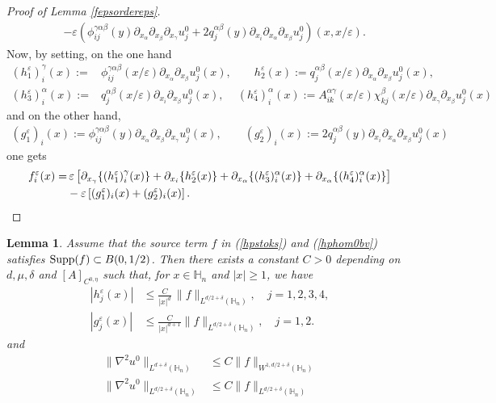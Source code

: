 \documentclass[11pt, reqno]{amsart}
\newtheorem{lemma}[theorem]{Lemma}
\theoremstyle{definition}
\theoremstyle{remark}
\numberwithin{equation}{section}
\DeclareMathOperator*{\Supp}{\textup{Supp}}
\begin{document}
\begin{proof}[Proof  of \textup{Lemma \ref{fepsordereps}}]
\begin{align*}
			&-\varepsilon \left( \phi^{\gamma\alpha\beta}_{ij}(y)\partial_{x_\alpha}\partial_{x_\beta} \partial_{x_\gamma} u_j^0+   2 q^{\alpha\beta}_{j}(y)\partial_{x_i} \partial_{x_\alpha}\partial_{x_\beta} u_j^0\right) (x,x/\varepsilon).
		\end{align*}
		Now, by setting, on the one hand
		\begin{align*}
			(h^\varepsilon_1)_i^\gamma (x)	:=& \phi^{\gamma\alpha\beta}_{ij}(x/\varepsilon)\partial_{x_\alpha}\partial_{x_\beta} u_j^0(x) , \qquad
			h^\varepsilon_2(x):= q^{\alpha\beta}_{j}(x/\varepsilon)\partial_{x_\alpha}\partial_{x_\beta} u_j^0(x), \\
			(h^\varepsilon_3)^\alpha_i(x):=&q^{\alpha\beta}_{j}(x/\varepsilon)\partial_{x_i}\partial_{x_\beta} u_j^0(x),\,\quad
			(h_4^\varepsilon)_i^\alpha(x):=  A^{\alpha\gamma}_{ik} (x/\varepsilon) \chi^{\beta}_{kj}(x/\varepsilon)\partial_{x_\gamma}	\partial_{ x_{\beta}}  u_j^0 (x)
		\end{align*}
		 and on the other hand,	\begin{align*}
			(g^\varepsilon_1)_i(x):=\phi^{\gamma\alpha\beta}_{ij}(y)\partial_{x_\alpha}\partial_{x_\beta} \partial_{x_\gamma} u_j^0(x), \qquad 
			(g^\varepsilon_2)_i(x) := 2q^{\alpha\beta}_{j}(y)\partial_{x_i} \partial_{x_\alpha}\partial_{x_\beta} u_j^0(x)
		\end{align*}  
		one gets 
		\begin{align*}
			f_i^\varepsilon(x)
			=& \,\varepsilon \left[ \partial_{x_\gamma} \{ 	(h^\varepsilon_1)_i^\gamma (x) \}	+ \partial_{x_i} \{ 	h^\varepsilon_2(x) \}
			+  \partial_{x_\alpha} \{ 	(h^\varepsilon_3)^\alpha_i(x) \}+ \partial_{x_\alpha}\{	(h_4^\varepsilon)_i^\alpha(x) \} \right]  \\
			&-\varepsilon \left[ 	(g^\varepsilon_1)_i(x)+	(g^\varepsilon_2)_i(x) \right] .\qquad\qquad\qedhere
		\end{align*}
		
	\end{proof}
	\begin{lemma}
		Assume that the source term $f$ in \textup{(\ref{hpstoks})} and \textup{(\ref{hphom0bv})} satisfies 
		$\Supp(f)\subset B(0, 1/2)$.	Then there exists a constant $C>0$ depending on $d,\mu, \delta$ and $[A]_{C^{0,\eta}}$ 
		such that, for $x\in \mathbb{H}_n$ and $|x|\geq 1$,   we have
		\begin{align}
			|h^\varepsilon_j (x) |&\leq \frac{C}{|x|^{d}}\, 
			\| f\|_{L^{d/2+\delta}(\mathbb{H}_n)}, \quad j=1,2,3,4,\label{boundh}\\
			|	g^\varepsilon_j (x) |&\leq \frac{C}{|x|^{d+1}}\| f\|_{L^{d/2+\delta}(\mathbb{H}_n)}, \quad j=1,2. \label{boundg}
		\end{align}
		and
\begin{align}
	\|\nabla^2 u^0 \|_{L^{d+\delta}( \mathbb{H}_n)}&\leq  C \|f \|_{W^{1,d/2+\delta}( \mathbb{H}_n)}\\
	\|\nabla^2 u^0  \|_{L^{d/2+\delta}( \mathbb{H}_n)}&\leq  C \|f \|_{L^{d/2+\delta}( \mathbb{H}_n)}
\end{align}		
	\end{lemma}
\end{document}
